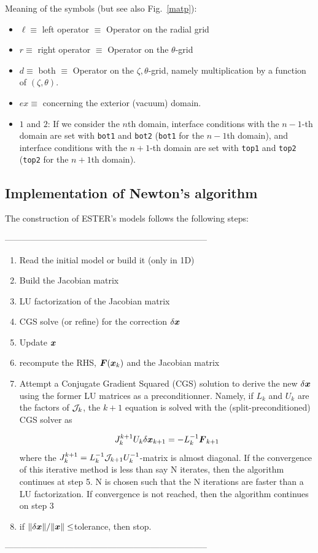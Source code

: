 Meaning of the symbols (but see also Fig.~\ref{matp}):
\begin{itemize}
\item $\ell\equiv$ left operator $\equiv$ Operator on the radial grid
\item $r\equiv$ right operator $\equiv$ Operator on the $\theta$-grid
\item $d\equiv$ both $\equiv$ Operator on the $\zeta,\theta$-grid, namely multiplication by a
function of $(\zeta,\theta)$.
\item $ex\equiv$ concerning the exterior (vacuum) domain.

\item $1$ and $2$: If we consider the $n$th domain, interface conditions with the $n-1$-th
domain are set with {\tt bot1} and {\tt bot2} ({\tt bot1} for the $n-1$th domain), and interface
conditions with the $n+1$-th domain are set with {\tt top1} and {\tt top2} ({\tt top2} for the
$n+1$th domain).
\end{itemize}

\subsection{Implementation of Newton's algorithm}

The construction of ESTER's models follows the following steps:


\noindent -----------------------------------------------------------------------
\begin{enumerate}

\item Read the initial model or build it (only in 1D)
\item Build the Jacobian matrix
\item LU factorization of the Jacobian matrix
\item CGS solve (or refine) for the correction $\delta\vx$
\item Update $\vx$
\item recompute the RHS, $\vF(\vx_k)$ and the Jacobian matrix
\item Attempt a Conjugate Gradient Squared (CGS) solution to derive the new
$\delta\vx$ using the former LU matrices as a preconditionner. Namely,
if $L_k$ and $U_k$ are the factors of $\mathcal{J}_k$, the $k+1$ equation is
solved with the (split-preconditioned) CGS solver as

\[ J_k^{k+1}U_k\delta\vx_{k+1} = -L_k^{-1}\vF_{k+1}  \]
where the $J_k^{k+1}=L_k^{-1}\mathcal{J}_{k+1}U_k^{-1}$-matrix is almost
diagonal. If the convergence of this iterative method is less than say N
iterates, then the algorithm continues at step 5. N is chosen such that
the N iterations are faster than a LU factorization. If convergence is
not reached, then the algorithm continues on step 3

\item if $\|\delta\vx\|/\|\vx\|\leq$tolerance, then stop.
\end{enumerate}
\noindent -----------------------------------------------------------------------

